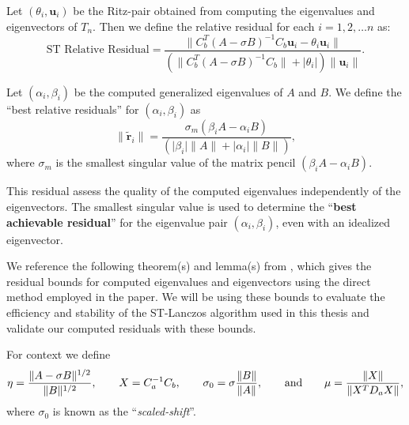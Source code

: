 \begin{definition}
\label{def:SpectralTransformedResidual}
	Let $(\theta_i, \mathbf{u}_i)$ be the Ritz-pair obtained from computing the eigenvalues and eigenvectors of $T_n$. Then we define the relative residual for each $i = 1, 2, \ldots n$ as:
	\begin{equation}\label{eq:STResidual}
		\text{ST Relative Residual} = \frac{\| C_b^T(A - \sigma B)^{-1}C_b \mathbf{u}_i - \theta_i \mathbf{u}_i \| }{( \| C_b^T(A - \sigma B)^{-1}C_b \| + \lvert \theta_i \rvert)\|\mathbf{u}_i\| }.
	\end{equation}
\end{definition}

\begin{definition}\label{def:BestResidual}
	Let $(\alpha_i, \beta_i)$ be the computed generalized eigenvalues of $A$ and $B$. We define the ``best relative residuals'' for $(\alpha_i, \beta_i)$ as
	\begin{equation}\label{eq:BestResiduals}
		\|\tilde{\mathbf{r}}_i\| = \frac{\sigma_m(\beta_i A - \alpha_i B)}{(\lvert \beta_i \rvert \|A\| + \lvert \alpha_i \rvert \|B\|)},
	\end{equation}
where $\sigma_m$ is the smallest singular value of the matrix pencil $(\beta_i A - \alpha_i B)$.
\end{definition}
This residual assess the quality of the computed eigenvalues independently of the eigenvectors. The smallest singular value is used to determine the ``\textbf{best achievable residual}'' for the eigenvalue pair $(\alpha_i, \beta_i)$, even with an idealized eigenvector.

We reference the following theorem(s) and lemma(s) from \cite{stewart2024spectraltransformationdensesymmetric}, which gives the residual bounds for computed eigenvalues and eigenvectors using the direct method employed in the paper. We will be using these bounds to evaluate the efficiency and stability of the ST-Lanczos algorithm used in this thesis and validate our computed residuals with these bounds.

For context we define
\begin{equation*}
  \eta = \frac{\|A-\sigma B\|^{1/2}}{\|B\|^{1/2}},\qquad
  X = C_a^{-1} C_b,\qquad \sigma_0 = \sigma \frac{\|B\|}{\|A\|}, \eqand \mu = \frac{\|X\|}{\|X^T D_a X\|},
\end{equation*}
where $\sigma_0$ is known as the ``\textit{scaled-shift}''.

